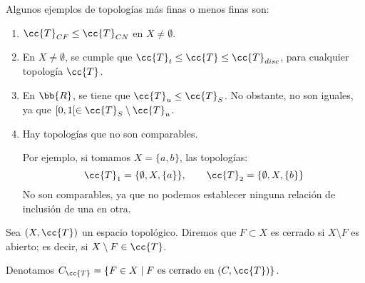 \begin{ejemplo}
    Algunos ejemplos de topologías más finas o menos finas son:
    \begin{enumerate}
        \item $\cc{T}_{CF}\leq \cc{T}_{CN}$ en $X\neq \emptyset$.
        \item En $X\neq \emptyset$, se cumple que $\cc{T}_t\leq \cc{T}\leq \cc{T}_{disc}$, para cualquier topología $\cc{T}$.
        \item En $\bb{R}$, se tiene que $\cc{T}_u\leq \cc{T}_S$. No obstante, no son iguales, ya que $[0,1[\in \cc{T}_S\setminus \cc{T}_u$.
        \item Hay topologías que no son comparables.

            Por ejemplo, si tomamos $X = \{a,b\}$, las topologías:
            \begin{equation*}
                \cc{T}_1 = \{\emptyset , X, \{a\}\}, \qquad \cc{T}_2 = \{\emptyset , X, \{b\}\}
            \end{equation*}
            No son comparables, ya que no podemos establecer ninguna relación de inclusión de una en otra.
    \end{enumerate}
\end{ejemplo}



\begin{definicion} Sea $(X,\cc{T})$ un espacio topológico. Diremos que $F\subset X$ es cerrado si $X\setminus F$ es abierto; es decir, si $X\setminus F\in \cc{T}$.

Denotamos $C_{\cc{T}}=\{F\in X\mid F \text{ es cerrado en } (C,\cc{T})\}$.
\end{definicion}

